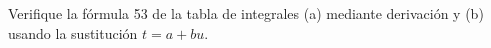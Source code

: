 \item Verifique la fórmula 53 de la tabla de integrales (a) mediante derivación y (b) usando la sustitución $t = a + bu$.
